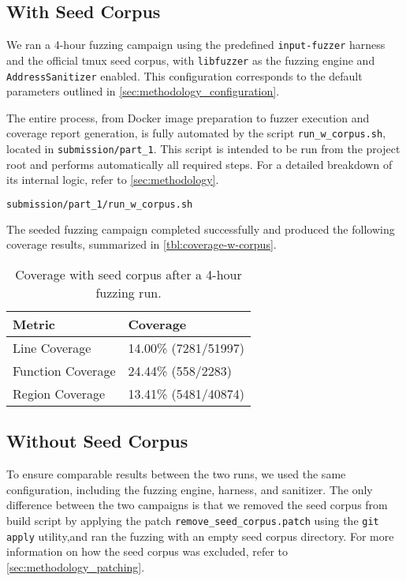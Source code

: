 \subsection{With Seed Corpus} \label{sec:with-seed}

We ran a 4-hour fuzzing campaign using the predefined \texttt{input-fuzzer} harness and the official tmux seed corpus, with \texttt{libfuzzer} as the fuzzing engine and \texttt{AddressSanitizer} enabled. This configuration corresponds to the default parameters outlined in \autoref{sec:methodology_configuration}.

The entire process, from Docker image preparation to fuzzer execution and coverage report generation, is fully automated by the script \texttt{run\_w\_corpus.sh}, located in \texttt{submission/part\_1}. This script is intended to be run from the project root and performs automatically all required steps. For a detailed breakdown of its internal logic, refer to \autoref{sec:methodology}.

\begin{lstlisting}[language=bash, caption=Bash command to run an automated fuzzing campaign with seed corpus]
submission/part_1/run_w_corpus.sh
\end{lstlisting}

The seeded fuzzing campaign completed successfully and produced the following coverage results, summarized in \autoref{tbl:coverage-w-corpus}.

\begin{table}[ht]
	\centering
	\begin{tabular}{@{}ll@{}}
		\toprule
		\textbf{Metric}   & \textbf{Coverage}    \\
		\midrule
		Line Coverage     & 14.00\% (7281/51997) \\
		Function Coverage & 24.44\% (558/2283)   \\
		Region Coverage   & 13.41\% (5481/40874) \\
		\bottomrule
	\end{tabular}
	\caption{Coverage with seed corpus after a 4-hour fuzzing run.}
	\label{tbl:coverage-w-corpus}
\end{table}

\subsection{Without Seed Corpus} \label{sec:without-seed}

To ensure comparable results between the two runs, we used the same configuration, including the fuzzing engine, harness, and sanitizer. The only difference between the two campaigns is that we removed the seed corpus from build script by applying the patch \texttt{remove\_seed\_corpus.patch} using the \texttt{git apply} utility,and ran the fuzzing with an empty seed corpus directory. For more information on how the seed corpus was excluded, refer to \autoref{sec:methodology_patching}.

